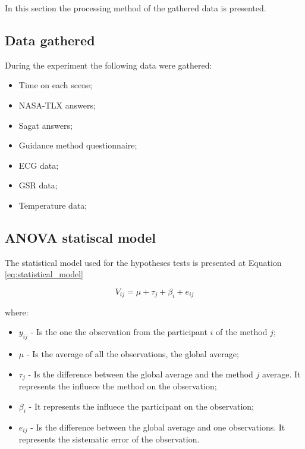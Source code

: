 In this section the processing method of the gathered data is presented.

\subsection{Data gathered}

During the experiment the following data were gathered:

\begin{itemize}
    \item Time on each scene;
    \item NASA-TLX answers;
    \item Sagat answers;
    \item Guidance method questionnaire;
    \item ECG data;
    \item GSR data;
    \item Temperature data;
\end{itemize}

\subsection{ANOVA statiscal model}

The statistical model used for the hypotheses tests is presented at Equation \ref{eq:statistical_model}

\begin{equation}
    \label{eq:statistical_model}
    V_{ij} = \mu + \tau_j + \beta_i +e_{ij}
\end{equation}

where:

\begin{itemize}
    \item $y_{ij}$ - Is the one the observation from the participant $i$ of the method $j$;
    \item $\mu$ - Is the average of all the observations, the global average;
    \item $\tau_j$ - Is the difference between the global average and the method $j$ average. It represents the influece the method on the observation;
    \item $\beta_i$ - It represents the influece the participant on the observation;
    \item $e_{ij}$ - Is the difference between the global average and one observations. It represents the sistematic error of the observation.
\end{itemize}

